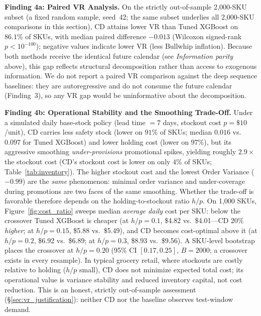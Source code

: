 \documentclass[10pt]{article} %
\theoremstyle{plain}
\theoremstyle{definition}
\begin{document}
\textbf{Finding 4a: Paired VR Analysis.} On the strictly out-of-sample 2{,}000-SKU subset (a fixed random sample, seed~42; the same subset underlies all 2{,}000-SKU comparisons in this section), CD attains lower VR than Tuned XGBoost on $86.1\%$ of SKUs, with median paired difference $-0.013$ (Wilcoxon signed-rank $p < 10^{-100}$); negative values indicate lower VR (less Bullwhip inflation). Because both methods receive the identical future calendar (see \emph{Information parity} above), this gap reflects structural decomposition rather than access to exogenous information. We do not report a paired VR comparison against the deep sequence baselines: they are autoregressive and do not consume the future calendar (Finding~3), so any VR gap would be uninformative about the decomposition.

\textbf{Finding 4b: Operational Stability and the Smoothing Trade-Off.} Under a simulated daily base-stock policy (lead time $=7$ days, stockout cost $p=\$10$/unit), CD carries less safety stock (lower on $91\%$ of SKUs; median $0.016$ vs.~$0.097$ for Tuned XGBoost) and lower holding cost (lower on $97\%$), but its aggressive smoothing \emph{under-provisions} promotional spikes, yielding roughly $2.9\times$ the stockout cost (CD's stockout cost is lower on only $4\%$ of SKUs; Table~\ref{tab:inventory}). The higher stockout cost and the lowest Order Variance ($-0.99$) are the \emph{same} phenomenon: minimal order variance and under-coverage during promotions are two faces of the same smoothing. Whether the trade-off is favorable therefore depends on the holding-to-stockout ratio $h/p$. On 1{,}000 SKUs, Figure~\ref{fig:cost_ratio} sweeps median \emph{average daily} cost per SKU: below the crossover Tuned XGBoost is cheaper (at $h/p=0.1$, \$4.82 vs.~\$4.01---CD $20\%$ \emph{higher}; at $h/p=0.15$, \$5.88 vs.~\$5.49), and CD becomes cost-optimal above it (at $h/p=0.2$, \$6.92 vs.~\$6.89; at $h/p=0.3$, \$8.93 vs.~\$9.56). A SKU-level bootstrap places the crossover at $h/p = 0.20$ (95\% CI $[0.17, 0.25]$, $B=2000$; a crossover exists in every resample). In typical grocery retail, where stockouts are costly relative to holding ($h/p$ small), CD does not minimize expected total cost; its operational value is variance stability and reduced inventory capital, not cost reduction. This is an honest, strictly out-of-sample assessment (\S\ref{sec:vr_justification}): neither CD nor the baseline observes test-window demand.
\end{document}
